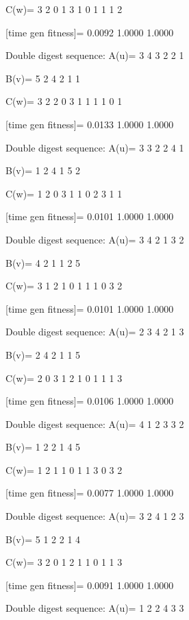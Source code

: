 C(w)=
     3     2     0     1     3     1     0     1     1     1     2

[time gen fitness]=
    0.0092    1.0000    1.0000

Double digest sequence:
A(u)=
     3     4     3     2     2     1

B(v)=
     5     2     4     2     1     1

C(w)=
     3     2     2     0     3     1     1     1     1     0     1

[time gen fitness]=
    0.0133    1.0000    1.0000

Double digest sequence:
A(u)=
     3     3     2     2     4     1

B(v)=
     1     2     4     1     5     2

C(w)=
     1     2     0     3     1     1     0     2     3     1     1

[time gen fitness]=
    0.0101    1.0000    1.0000

Double digest sequence:
A(u)=
     3     4     2     1     3     2

B(v)=
     4     2     1     1     2     5

C(w)=
     3     1     2     1     0     1     1     1     0     3     2

[time gen fitness]=
    0.0101    1.0000    1.0000

Double digest sequence:
A(u)=
     2     3     4     2     1     3

B(v)=
     2     4     2     1     1     5

C(w)=
     2     0     3     1     2     1     0     1     1     1     3

[time gen fitness]=
    0.0106    1.0000    1.0000

Double digest sequence:
A(u)=
     4     1     2     3     3     2

B(v)=
     1     2     2     1     4     5

C(w)=
     1     2     1     1     0     1     1     3     0     3     2

[time gen fitness]=
    0.0077    1.0000    1.0000

Double digest sequence:
A(u)=
     3     2     4     1     2     3

B(v)=
     5     1     2     2     1     4

C(w)=
     3     2     0     1     2     1     1     0     1     1     3

[time gen fitness]=
    0.0091    1.0000    1.0000

Double digest sequence:
A(u)=
     1     2     2     4     3     3

